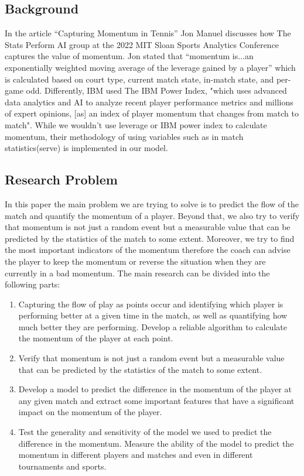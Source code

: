 \documentclass[12pt]{article}
\begin{document}
\subsection{Background}

\quad In the article “Capturing Momentum in Tennis” Jon Manuel discusses how The Stats Perform AI group at the 2022 MIT Sloan Sports Analytics Conference captures the value of momentum. Jon stated that “momentum is...an exponentially weighted moving average of the leverage gained by a player” which is calculated based on court type, current match state, in-match state, and per-game odd\cite{mit-tennis}. Differently, IBM used The IBM Power Index, "which uses advanced data analytics and AI to analyze recent player performance metrics and millions of expert opinions, [as] an index of player momentum that changes from match to match"\cite{ibm-tennis}. While we wouldn't use leverage or IBM power index to calculate momentum, their methodology of using variables such as in match statistics(serve) is implemented in our model. 
\subsection{Research Problem}
\quad In this paper the main problem we are trying to solve is to predict the flow of the match and quantify the momentum of a player. Beyond that, we also try to verify that momentum is not just a random event but a measurable value
that can be predicted by the statistics of the match to some extent. Moreover, we try to find the most important indicators of the momentum therefore the coach can advise the player to keep the momentum or reverse the situation 
when they are currently in a bad momentum. The main research can be divided into the following parts:
\begin{enumerate}
    \item Capturing the flow of play as points occur and identifying which player is performing better at a given time in the match, as well as quantifying how much better they are performing. Develop a reliable algorithm to calculate
    the momentum of the player at each point.
    \item Verify that momentum is not just a random event but a measurable value that can be predicted by the statistics of the match to some extent.
    \item Develop a model to predict the difference in the momentum of the player at any given match and extract some important features that have a significant impact on the momentum of the player. 
    \item Test the generality and sensitivity of the model we used to predict the difference in the momentum. Measure the ability of the model to predict the momentum in different players and matches and even
    in different tournaments and sports.
\end{enumerate}
\end{document}
